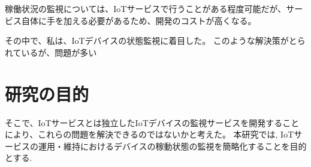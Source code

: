稼働状況の監視については、IoTサービスで行うことがある程度可能だが、サービス自体に手を加える必要があるため、開発のコストが高くなる。

その中で、私は、IoTデバイスの状態監視に着目した。
このような解決策がとられているが、問題が多い

\section{研究の目的}
そこで、IoTサービスとは独立したIoTデバイスの監視サービスを開発することにより、これらの問題を解決できるのではないかと考えた。
本研究では, IoTサービスの運用・維持におけるデバイスの稼動状態の監視を簡略化することを目的とする.

